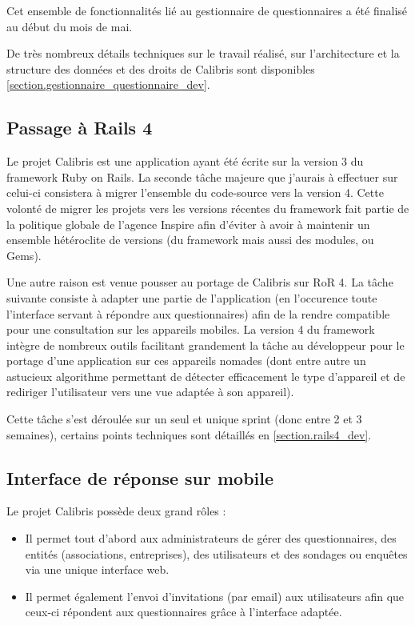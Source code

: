 \documentclass[12pt,a4paper]{book}
\begin{document}
Cet ensemble de fonctionnalités lié au gestionnaire de questionnaires a été finalisé au début du mois de mai.

De très nombreux détails techniques sur le travail réalisé, sur l'architecture et la structure des données et des droits de Calibris sont disponibles \cref{section.gestionnaire_questionnaire_dev}.

\subsection{Passage à Rails 4}

Le projet Calibris est une application ayant été écrite sur la version 3 du framework Ruby on Rails. La seconde tâche majeure que j'aurais à effectuer sur celui-ci consistera à migrer l'ensemble du code-source vers la version 4. Cette volonté de migrer les projets vers les versions récentes du framework fait partie de la politique globale de l'agence Inspire afin d'éviter à avoir à maintenir un ensemble hétéroclite de versions (du framework mais aussi des modules, ou Gems).

Une autre raison est venue pousser au portage de Calibris sur RoR 4. La tâche suivante consiste à adapter une partie de l'application (en l'occurence toute l'interface servant à répondre aux questionnaires) afin de la rendre compatible pour une consultation sur les appareils mobiles. La version 4 du framework intègre de nombreux outils facilitant grandement la tâche au développeur pour le portage d'une application sur ces appareils nomades (dont entre autre un astucieux algorithme permettant de détecter efficacement le type d'appareil et de rediriger l'utilisateur vers une vue adaptée à son appareil).

Cette tâche s'est déroulée sur un seul et unique sprint (donc entre 2 et 3 semaines), certains points techniques sont détaillés en \cref{section.rails4_dev}.

\subsection{Interface de réponse sur mobile}

Le projet Calibris possède deux grand rôles :
\begin{itemize}
  \item Il permet tout d'abord aux administrateurs de gérer des questionnaires, des entités (associations, entreprises), des utilisateurs et des sondages ou enquêtes via une unique interface web.
  \item Il permet également l'envoi d'invitations (par email) aux utilisateurs afin que ceux-ci répondent aux questionnaires grâce à l'interface adaptée.  
\end{itemize}
\end{document}
